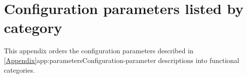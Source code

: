 \chapter{Configuration parameters listed by category}
\label{app:catpars}

This appendix orders the configuration parameters described in
\cref{Appendix}{app:parameters}{Configuration-parameter descriptions}
into functional categories.

\sstminitoc{}


